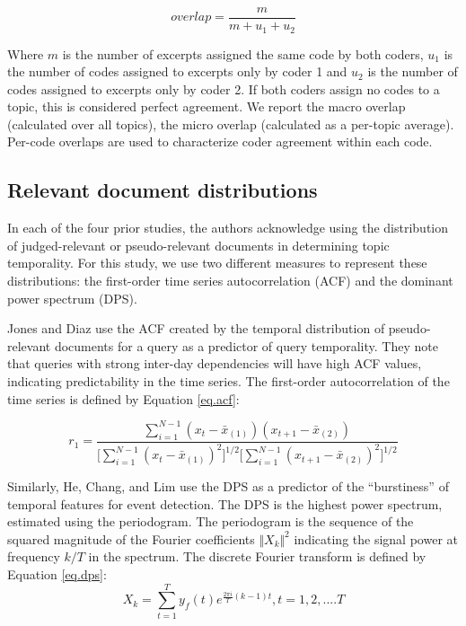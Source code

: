 \documentclass[runningheads,a4paper]{llncs}
\begin{document}
\[
overlap = \frac{m}{m + u_1 + u_2} 
\]

Where $m$ is the number of excerpts assigned the same code by both coders, $u_1$ is the number of codes assigned to excerpts only by coder 1 and $u_2$ is the number of codes assigned to excerpts only by coder 2. If both coders assign no codes to a topic, this is considered perfect agreement. We report the macro overlap (calculated over all topics), the micro overlap (calculated as a per-topic average).  Per-code overlaps are used to characterize coder agreement within each code.

\subsection{Relevant document distributions}

In each of the four prior studies, the authors acknowledge using the distribution of judged-relevant or pseudo-relevant documents in determining topic temporality. For this study, we use two different measures to represent these distributions: the first-order time series autocorrelation (ACF) and the dominant power spectrum (DPS).

Jones and Diaz \cite{Jones2007} use the ACF created by the temporal distribution of pseudo-relevant documents for a query as a predictor of query temporality. They note that queries with strong inter-day dependencies will have high ACF values, indicating predictability in the time series. The first-order autocorrelation of the time series is defined by Equation \ref{eq.acf}:

\begin{equation}
r_1 = \dfrac{\sum_{i=1}^{N-1} (x_t - \bar{x}_{(1)})(x_{t+1} - \bar{x}_{(2)})}{ \big [ \sum_{i=1}^{N-1}  (x_t - \bar{x}_{(1)})^2 \big ] ^{1/2} \big [\sum_{i=1}^{N-1} (x_{t+1} - \bar{x}_{(2)})^2 \big ]^{1/2}}
\label{eq.acf}
\end{equation}

Similarly, He, Chang, and Lim \cite{He2007} use the DPS as a predictor of the ``burstiness'' of temporal features for event detection. The DPS is the highest power spectrum, estimated using the periodogram. The periodogram is the sequence of the squared magnitude of the Fourier coefficients $\Vert X_k \Vert^2$ indicating the signal power at frequency $k/T$ in the spectrum.  The discrete Fourier transform is defined by Equation \ref{eq.dps}:
\begin{equation}
X_k = \sum_{t=1}^T y_f(t)e^{\frac{2\pi i}{T}(k - 1)t}, t=1,2,....T
\label{eq.dps}
\end{equation}
\end{document}
